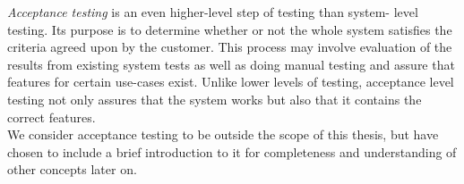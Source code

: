 
\emph{Acceptance testing} is an even higher-level step of testing than
system- level testing. Its purpose is to determine whether or not the
whole system satisfies the criteria agreed upon by the customer. This
process may involve evaluation of the results from existing system tests
as well as doing manual testing and assure that features for certain
use-cases exist. Unlike lower levels of testing, acceptance level
testing not only assures that the system works but also that it contains
the correct features. \cite{book:adp, wiki:acceptance}\\

We consider acceptance testing to be outside the scope of this thesis,
but have chosen to include a brief introduction to it for completeness
and understanding of other concepts later on.\\
